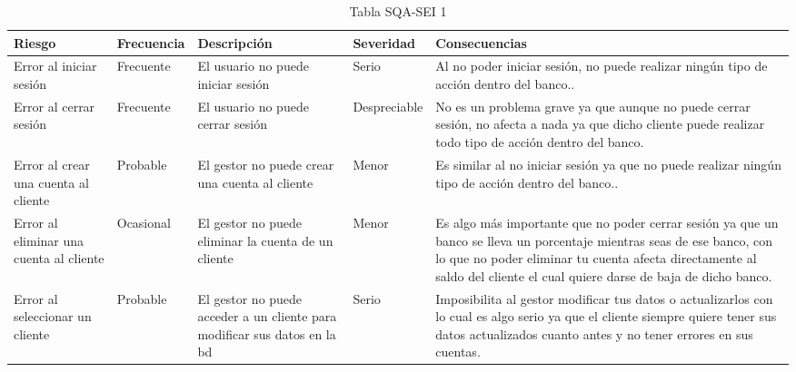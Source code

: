 \begin{table}[H]
	\centering
	\small
	\begin{tabularx}{\textwidth}{|>{\columncolor[gray]{0.8}}p{3cm}|p{1.9cm}|p{3cm}|p{2.1cm}|X|}
		\hline
		\rowcolor{gray}
		Riesgo                                  & Frecuencia & Descripción                                                                     & Severidad    & Consecuencias                                                                                                                                                                                                                                     \\
		\hline
		Error al iniciar sesión                 & Frecuente  & El usuario no puede iniciar sesión                                              & Serio        & Al no poder iniciar sesión, no puede realizar ningún tipo de acción dentro del banco..                                                                                                                                                            \\
		\hline
		Error al cerrar sesión                  & Frecuente  & El usuario no puede cerrar sesión                                               & Despreciable & No es un problema grave ya que aunque no puede cerrar sesión, no afecta a nada ya que dicho cliente puede realizar todo tipo de acción dentro del banco.                                                                                          \\
		\hline
		Error al crear una cuenta al cliente    & Probable   & El gestor no puede crear una cuenta al cliente                                  & Menor        & Es similar al no iniciar sesión ya que no puede realizar ningún tipo de acción dentro del banco..                                                                                                                                                 \\
		\hline
		Error al eliminar una cuenta al cliente & Ocasional  & El gestor no puede eliminar la cuenta de un cliente                             & Menor        & Es algo más importante que no poder cerrar sesión ya que un banco se lleva un porcentaje mientras seas de ese banco, con lo que no poder eliminar tu cuenta afecta directamente al saldo del cliente el cual quiere darse de baja de dicho banco. \\
		\hline
		Error al seleccionar un cliente         & Probable   & El gestor no puede acceder a un cliente para modificar sus datos en la \gls{bd} & Serio        & Imposibilita al gestor modificar tus datos o actualizarlos con lo cual es algo serio ya que el cliente siempre quiere tener sus datos actualizados cuanto antes y no tener errores en sus cuentas.                                                \\
		\hline
	\end{tabularx}
	\caption{Tabla SQA-SEI 1}
\end{table}


